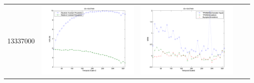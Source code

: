 \documentclass[11pt]{article}
\begin{document}
\begin{table}[H]
{\begin{tabular}{c  c   c   c c }
13337000&\begin{minipage}{.4\textwidth}\includegraphics[width=\linewidth]{resultgraph/13337000e.png}\end{minipage}
&\begin{minipage}{.4\textwidth}\includegraphics[width=\linewidth]{resultgraph/13337000MI.png}\end{minipage}

\end{tabular}}
\end{table}
\end{document}
